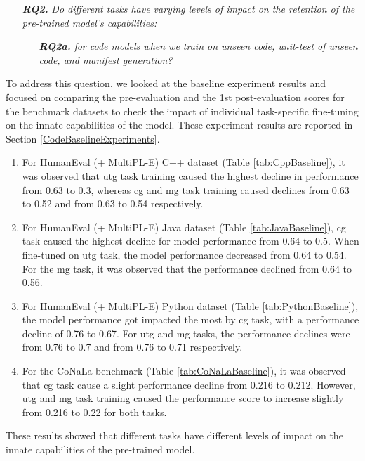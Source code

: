 \newcommand{\RQtwo}{Do different tasks have varying levels of impact on the retention of the pre-trained model’s capabilities:}
\newcommand{\RQtwoa}{for code models when we train on unseen code, unit-test of unseen code, and manifest generation?}

\begin{enumerate}
    \item[\textit{\textbf{RQ2.}}] \textit{\RQtwo}
    \begin{enumerate}
        \item[\textit{\textbf{RQ2a.}}] \textit{\RQtwoa}
    \end{enumerate}
\end{enumerate}

To address this question, we looked at the baseline experiment results and focused on comparing the pre-evaluation and the 1st post-evaluation scores for the benchmark datasets to check the impact of individual task-specific fine-tuning on the innate capabilities of the model. These experiment results are reported in Section \ref{CodeBaselineExperiments}. 
\begin{enumerate}
\item For HumanEval (+ MultiPL-E) C++ dataset (Table \ref{tab:CppBaseline}), it was observed that utg task training caused the highest decline in performance from 0.63 to 0.3, whereas cg and mg task training caused declines from 0.63 to 0.52 and from 0.63 to 0.54 respectively.
\item For HumanEval (+ MultiPL-E) Java dataset (Table \ref{tab:JavaBaseline}), cg task caused the highest decline for model performance from 0.64 to 0.5. When fine-tuned on utg task, the model performance decreased from 0.64 to 0.54. For the mg task, it was observed that the performance declined from 0.64 to 0.56.
\item For HumanEval (+ MultiPL-E) Python dataset (Table \ref{tab:PythonBaseline}), the model performance got impacted the most by cg task, with a performance decline of 0.76 to 0.67. For utg and mg tasks, the performance declines were from 0.76 to 0.7 and from 0.76 to 0.71 respectively.
\item For the CoNaLa benchmark (Table \ref{tab:CoNaLaBaseline}), it was observed that cg task cause a slight performance decline from 0.216 to 0.212. However, utg and mg task training caused the performance score to increase slightly from 0.216 to 0.22 for both tasks.
\end{enumerate}
These results showed that different tasks have different levels of impact on the innate capabilities of the pre-trained model. 


